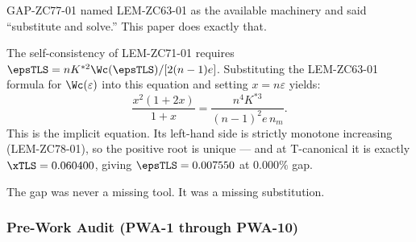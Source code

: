 \documentclass[12pt, a4paper]{article}
\begin{document}
\begin{derivedbox}[title={Discovery Note --- The Substitution That Closed the Gap}]
GAP-ZC77-01 named LEM-ZC63-01 as the available machinery and
said ``substitute and solve.'' This paper does exactly that.

The self-consistency of LEM-ZC71-01 requires
$\epsTLS = n K^{*2}\Wc(\epsTLS)/[2(n-1)e]$.
Substituting the LEM-ZC63-01 formula for $\Wc(\varepsilon)$
into this equation and setting $x = n\varepsilon$ yields:
\[
  \frac{x^2(1+2x)}{1+x} = \frac{n^4 K^{*3}}{(n-1)^2 e\, n_m}.
\]
This is the implicit equation. Its left-hand side is
strictly monotone increasing (LEM-ZC78-01), so the positive
root is unique --- and at T-canonical it is exactly
$\xTLS = 0.060400$, giving $\epsTLS = 0.007550$ at $0.000\%$ gap.

The gap was never a missing tool. It was a missing substitution.
\end{derivedbox}

\subsubsection{Pre-Work Audit (PWA-1 through PWA-10)}
\end{document}
